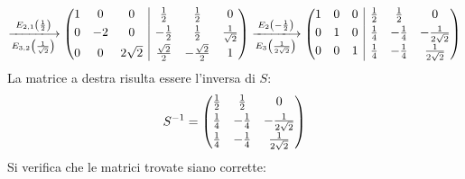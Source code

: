 \documentclass[a4paper]{article}
\makeatletter
\newenvironment{rowequmat}[1]{\left(\array{@{}#1@{}}}{\endarray\right)}
\makeatother
\begin{document}
	\begin{equation*}
		\xlongrightarrow[E_{3,2}\left(\frac{1}{\sqrt{2}}\right)]{E_{2,1}\left(\frac{1}{2}\right)}
		\begin{rowequmat}{ccc|ccc}
			1 & 0			& 0			& \frac{1}{2} & \frac{1}{2} & 0 \\ [.3em]
			0 & -2			& 0		& -\frac{1}{2} & \frac{1}{2} & \frac{1}{\sqrt{2}} \\ [.3em]
			0 & 0	& 2\sqrt{2}	& \frac{\sqrt{2}}{2} & -\frac{\sqrt{2}}{2} & 1
		\end{rowequmat}
		\xlongrightarrow[E_{3}\left(\frac{1}{2\sqrt{2}}\right)]{E_{2}\left(-\frac{1}{2}\right)}
		\begin{rowequmat}{ccc|ccc}
			1 & 0			& 0			& \frac{1}{2} & \frac{1}{2} & 0 \\ [.3em]
			0 & 1			& 0		& \frac{1}{4} & -\frac{1}{4} & -\frac{1}{2\sqrt{2}} \\ [.3em]
			0 & 0	& 1	& \frac{1}{4} & -\frac{1}{4} & \frac{1}{2\sqrt{2}}
		\end{rowequmat}
	\end{equation*}
	La matrice a destra risulta essere l'inversa di $S$:
	\begin{equation*}
		S^{-1} = \begin{rowequmat}{ccc}
			\frac{1}{2} & \frac{1}{2} & 0 \\ [.3em]
			\frac{1}{4} & -\frac{1}{4} & -\frac{1}{2\sqrt{2}} \\ [.3em]
			\frac{1}{4} & -\frac{1}{4} & \frac{1}{2\sqrt{2}}
		\end{rowequmat}
	\end{equation*}
	Si verifica che le matrici trovate siano corrette:
\end{document}
